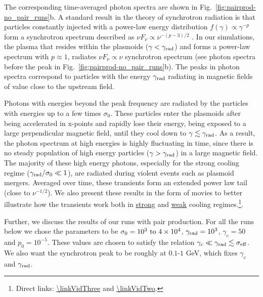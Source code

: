 The corresponding time-averaged photon spectra are shown in Fig.~\ref{fig:pairprod-no_pair_runs}b. A standard result in the theory of synchrotron radiation is that particles constantly injected with a power-law energy distribution $f(\gamma)\propto \gamma^{-p}$ form a synchrotron spectrum described as $\nu F_{\nu}\propto \nu^{-(p-3)/2}$ \citep{1979rpa..book.....R}. In our simulations, the plasma that resides within the plasmoids ($\gamma < \gamma_{\rm rad}$)  and forms a power-law spectrum with $p\approx 1$, radiates $\nu F_{\nu}\propto \nu$ synchrotron spectrum (see photon spectra before the peak in Fig.~\ref{fig:pairprod-no_pair_runs}b). The peaks in photon spectra correspond to particles with the energy $\gamma_{\rm rad}$ radiating in magnetic fields of value close to the upstream field.

Photons with energies beyond the peak frequency are radiated by the particles with energies up to a few times $\sigma_0$. These particles enter the plasmoids after being accelerated in x-points and rapidly lose their energy, being exposed to a large perpendicular magnetic field, until they cool down to $\gamma\lesssim \gamma_{\rm rad}$. As a result, the photon spectrum at high energies is highly fluctuating in time, since there is no steady population of high energy particles ($\gamma > \gamma_{\rm rad}$) in a large magnetic field. The majority of these high energy photons, especially for the strong cooling regime ($\gamma_{\rm rad}/\sigma_0\ll 1$), are radiated during violent events such as plasmoid mergers. Averaged over time,  these transients form an extended power law tail (close to $\nu^{-1/2}$). We also present these results in the form of movies to better illustrate how the transients work both in \href{\linkVidThree}{strong} and \href{\linkVidTwo}{weak} cooling regimes.\footnote{Direct links: \url{\linkVidThree} and \url{\linkVidTwo}.}.

Further, we discuss the results of our runs with pair production. For all the runs below we chose the parameters to be $\sigma_0=10^3\text~\text{to}~4\times10^4$, $\gamma_{\rm rad} = 10^3$, $\gamma_c=50$ and $p_0=10^{-5}$. These values are chosen to satisfy the relation $\gamma_c \ll \gamma_{\rm rad} \lesssim \sigma_{\rm eff}$. We also want the synchrotron peak to be roughly at $0.1\text{-}1$ GeV, which fixes $\gamma_c$ and $\gamma_{\rm rad}$. %

